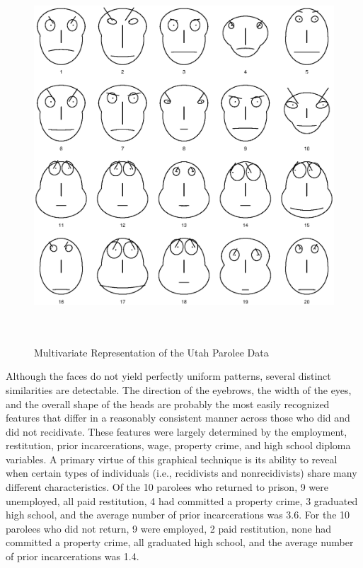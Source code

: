 \begin{figure}[t]
\begin{center}
\includegraphics[height=14cm,keepaspectratio=true]{faces3.eps}
\caption{Multivariate Representation of the Utah Parolee Data}
\end{center}
\end{figure}

Although the faces do not yield perfectly uniform patterns, several distinct similarities are detectable.  The direction of the eyebrows, the width of the eyes, and the overall shape of the heads are probably the most easily recognized features that differ in a reasonably consistent manner across those who did and did not recidivate.  These features were largely determined by the employment, restitution, prior incarcerations, wage, property crime, and high school diploma variables.  A primary virtue of this graphical technique is its ability to reveal when certain types of individuals (i.e., recidivists and nonrecidivists) share many different characteristics.  Of the 10 parolees who returned to prison, 9 were unemployed, all paid restitution, 4 had committed a property crime, 3 graduated high school, and the average number of prior incarcerations was 3.6.  For the 10 parolees who did not return, 9 were employed, 2 paid restitution, none had committed a property crime, all graduated high school, and the average number of prior incarcerations was 1.4.

